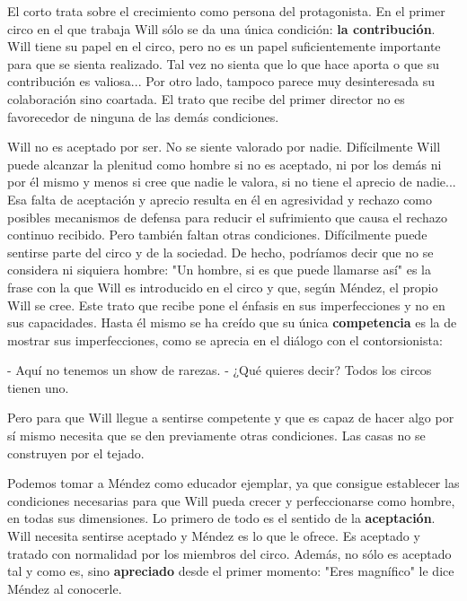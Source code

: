 

\newcommand{\nick}{Will\xspace}
\newcommand{\mendez}{Méndez\xspace}


El corto trata sobre el crecimiento como persona del protagonista. 
%
En el primer circo en el que trabaja \nick sólo se da una única condición: \textbf{la contribución}. 
%
\nick tiene su papel en el circo, pero no es un papel suficientemente importante para que se sienta realizado. 
%
Tal vez no sienta que lo que hace aporta o que su contribución es valiosa... Por otro lado, tampoco parece muy desinteresada su colaboración sino coartada. 
%
El trato que recibe del primer director no es favorecedor de ninguna de las demás condiciones.

\nick no es aceptado por ser. No se siente valorado por nadie. 
%
Difícilmente \nick puede alcanzar la plenitud como hombre si no es aceptado, ni por los demás ni por él mismo y menos si cree que nadie le valora, si no tiene el aprecio de nadie...
%
Esa falta de aceptación y aprecio resulta en él en agresividad y rechazo como posibles mecanismos de defensa para reducir el sufrimiento que causa el rechazo continuo recibido.
%
Pero también faltan otras condiciones. 
%
Difícilmente puede sentirse parte del circo y de la sociedad. De hecho, podríamos decir que no se considera ni siquiera hombre:
"Un hombre, si es que puede llamarse así" es la frase con la que \nick es introducido en el circo y que, según \mendez, el propio \nick se cree.
%
Este trato que recibe pone el énfasis en sus imperfecciones y no en sus capacidades.
%
Hasta él mismo se ha creído que su única \textbf{competencia} es la de mostrar sus imperfecciones, como se aprecia en el diálogo con el contorsionista:

- Aquí no tenemos un show de rarezas.
- ¿Qué quieres decir? Todos los circos tienen uno. 

Pero para que \nick llegue a sentirse competente y que es capaz de hacer algo por sí mismo necesita que se den previamente otras condiciones.
%
Las casas no se construyen por el tejado.



Podemos tomar a \mendez como educador ejemplar, ya que consigue establecer las condiciones necesarias para que \nick pueda crecer y perfeccionarse como hombre, en todas sus dimensiones.
%
Lo primero de todo es el sentido de la \textbf{aceptación}.
%
\nick necesita sentirse aceptado y \mendez es lo que le ofrece. 
%
Es aceptado y tratado con normalidad por los miembros del circo.
%
Además, no sólo es aceptado tal y como es, sino \textbf{apreciado} desde el primer momento: "Eres magnífico" le dice \mendez al conocerle.

